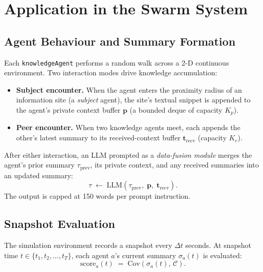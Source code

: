 \documentclass[10pt,twocolumn]{article}
\begin{document}
\section{Application in the Swarm System}

\subsection{Agent Behaviour and Summary Formation}

Each \texttt{knowledgeAgent} performs a random walk across a 2-D
continuous environment. Two interaction modes drive knowledge accumulation:
%
\begin{itemize}
  \item \textbf{Subject encounter.} When the agent enters the proximity
    radius of an information site (a \emph{subject} agent), the site's
    textual snippet is appended to the agent's private context buffer
    $\mathbf{p}$ (a bounded deque of capacity $K_p$).
  \item \textbf{Peer encounter.} When two knowledge agents meet, each
    appends the other's latest summary to its received-context buffer
    $\mathbf{t}_{\mathrm{recv}}$ (capacity $K_r$).
\end{itemize}
%
After either interaction, an LLM prompted as a \emph{data-fusion module}
merges the agent's prior summary $\tau_{\mathrm{prev}}$, its private
context, and any received summaries into an updated summary:
%
\begin{equation}
  \tau \;\leftarrow\;
  \mathrm{LLM}\!\left(\tau_{\mathrm{prev}},\;\mathbf{p},\;
  \mathbf{t}_{\mathrm{recv}}\right).
  \label{eq:llm}
\end{equation}
%
The output is capped at 150 words per prompt instruction.

\subsection{Snapshot Evaluation}

The simulation environment records a snapshot every $\Delta t$ seconds.
At snapshot time $t \in \{t_1, t_2, \ldots, t_T\}$, each agent $a$'s
current summary $\sigma_a(t)$ is evaluated:
%
\begin{equation}
  \mathrm{score}_a(t)
  \;=\;
  \mathrm{Cov}\!\left(\sigma_a(t),\,\mathcal{C}\right).
  \label{eq:per-agent}
\end{equation}
\end{document}
